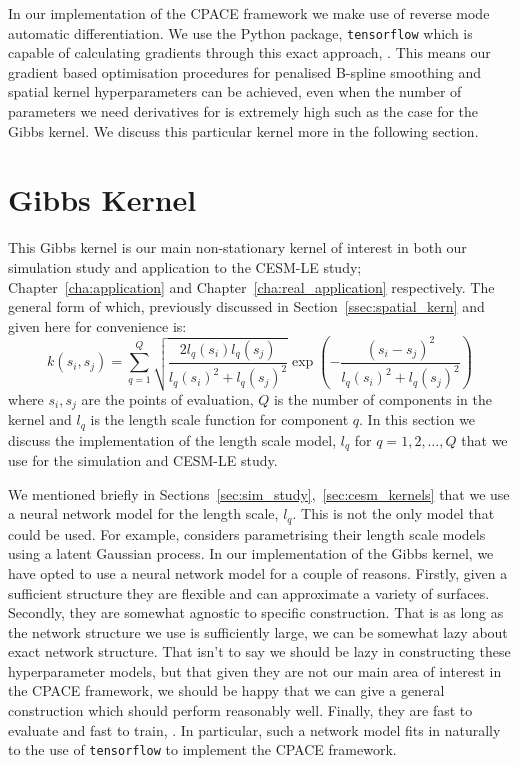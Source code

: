 In our implementation of the CPACE framework we make use of reverse mode automatic differentiation.
We use the Python package, \verb*|tensorflow| which is capable of calculating gradients through this exact approach, \citep{abadi_tensorflow_2016}. 
This means our gradient based optimisation procedures for penalised B-spline smoothing and spatial kernel hyperparameters can be achieved, even when the number of parameters we need derivatives for is extremely high such as the case for the Gibbs kernel.
We discuss this particular kernel more in the following section.


\section{Gibbs Kernel \label{sec:gibbs_kernel}}
This Gibbs kernel is our main non-stationary kernel of interest in both our simulation study and application to the CESM-LE study; Chapter~\ref{cha:application} and Chapter~\ref{cha:real_application} respectively.
The general form of which, previously discussed in Section~\ref{ssec:spatial_kern} and given here for convenience is: 
\begin{equation}
	k\left(s_{i}, s_{j}\right) = \sum_{q=1}^{Q} \sqrt{\frac{2l_q(s_i)l_q(s_j)}{l_q(s_i)^2 + l_q(s_j)^2}} \exp \left(-\frac{\left(s_i - s_j\right)^2}{l_q(s_i)^2 + l_q(s_j)^2}\right)
\end{equation}
where $s_i, s_j$ are the points of evaluation, $Q$ is the number of components in the kernel and $l_q$ is the length scale  function for component $q$.
In this section we discuss the implementation of the length scale model, $l_q$ for $q=1,2,\dots,Q$ that we use for the simulation and CESM-LE study.

We mentioned briefly in Sections~\ref{sec:sim_study},~\ref{sec:cesm_kernels} that we use a neural network model for the length scale, $l_q$.
This is not the only model that could be used.
For example, \citep{paciorek_spatial_2006} considers parametrising their length scale models using a latent Gaussian process.
In our implementation of the Gibbs kernel, we have opted to use a neural network model for a couple of reasons.
Firstly, given a sufficient structure they are flexible and can approximate a variety of surfaces.
Secondly, they are somewhat agnostic to specific construction.
That is as long as the network structure we use is sufficiently large, we can be somewhat lazy about exact network structure. 
That isn't to say we should be lazy in constructing these hyperparameter models, but that given they are not our main area of interest in the CPACE framework, we should be happy that we can give a general construction which should perform reasonably well.
Finally, they are fast to evaluate and fast to train, \citep{abadi_tensorflow_2016}.
In particular, such a network model fits in naturally to the use of \verb*|tensorflow| to implement the CPACE framework.


